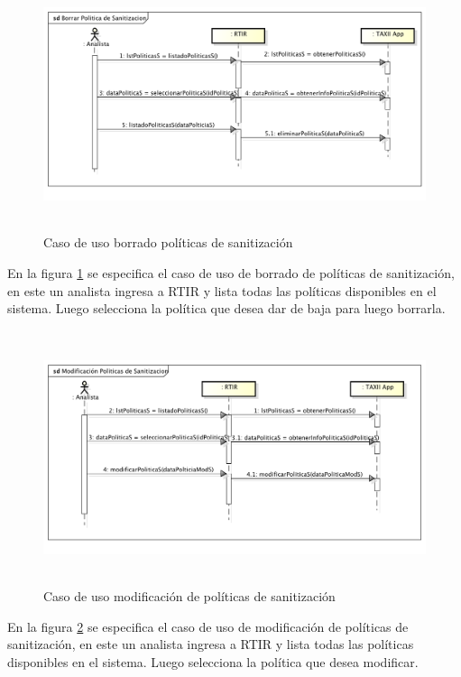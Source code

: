 \begin{figure}[ht!]
	\centering
	\includegraphics[width=5.7638in,height=2.9146in]{Analisis22-img/Analisis22-img018.png} 
	\caption{Caso de uso borrado políticas de sanitización}
	\label{fig.borradosanitizacion}
\end{figure}

\bigskip

	En la figura \ref{fig.borradosanitizacion} se especifica el caso de uso de borrado de políticas de sanitización, en este un analista ingresa a RTIR
	y lista todas las políticas disponibles en el sistema. Luego selecciona la política que desea dar de baja para luego
	borrarla.


\newpage
\begin{figure}[ht!]
	\centering
	\includegraphics[width=5.7638in,height=2.9256in]{Analisis22-img/Analisis22-img019.png} 
	\caption{Caso de uso modificación de políticas de sanitización}
	\label{fig.modificacionsanitizacion}
\end{figure}
\bigskip
	En la figura \ref{fig.modificacionsanitizacion} se especifica el caso de uso de modificación de políticas de sanitización, en este un analista ingresa a
	RTIR y lista todas las políticas disponibles en el sistema. Luego selecciona la política que desea modificar.
\newpage
